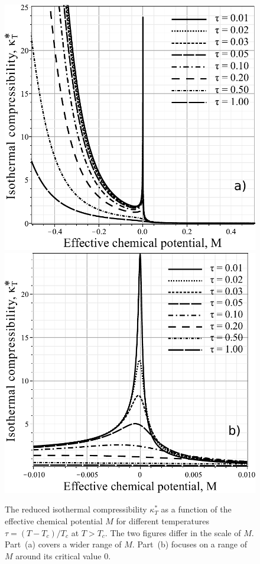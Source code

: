 \begin{figure}[h!] 
	\includegraphics[width=\column]{f2b.pdf}
	\includegraphics[width=\column]{f2c.pdf}
	\vskip-3mm
	\caption{The reduced isothermal compressibility $\kappa^*_T$ as a function of the effective chemical potential $M$ for different temperatures $\tau = (T - T_c)/T_c$ at $T > T_c$. The two figures differ in the scale of $M$. Part~(a) covers a wider range of $M$. Part~(b) focuses on a range of $M$ around its critical value $0$.
	}
	\label{fig2b}
\end{figure}


